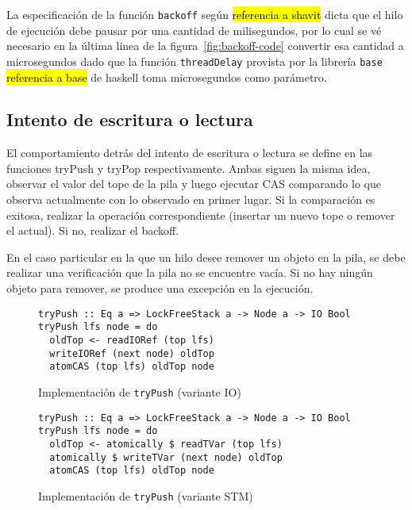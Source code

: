 La especificación de la función \texttt{backoff} según \hl{referencia a shavit} dicta que el hilo de ejecución debe pausar por una cantidad de milisegundos, por lo cual se vé necesario en la última linea de la figura~\ref{fig:backoff-code} convertir esa cantidad a microsegundos dado que la función \texttt{threadDelay} provista por la librería \texttt{base} \hl{referencia a base} de haskell toma microsegundos como parámetro.

\clearpage
\subsection{Intento de escritura o lectura}\label{sub:lfs-tries}
El comportamiento detrás del intento de escritura o lectura se define en las funciones tryPush y tryPop respectivamente. Ambas siguen la misma idea, observar el valor del tope de la pila y luego ejecutar CAS comparando lo que observa actualmente con lo observado en primer lugar. Si la comparación es exitosa, realizar la operación correspondiente (insertar un nuevo tope o remover el actual). Si no, realizar el backoff.

En el caso particular en la que un hilo desee remover un objeto en la pila, se debe realizar una verificación que la pila no se encuentre vacía. Si no hay ningún objeto para remover, se produce una excepción en la ejecución.

\begin{figure}[H]
\begin{verbatim}
tryPush :: Eq a => LockFreeStack a -> Node a -> IO Bool
tryPush lfs node = do
  oldTop <- readIORef (top lfs)
  writeIORef (next node) oldTop
  atomCAS (top lfs) oldTop node
\end{verbatim}
\caption{Implementación de \texttt{tryPush} (variante IO)}
\label{fig:lfs-trypush-io}
\end{figure}

\begin{figure}[H]
\begin{verbatim}
tryPush :: Eq a => LockFreeStack a -> Node a -> IO Bool
tryPush lfs node = do
  oldTop <- atomically $ readTVar (top lfs)
  atomically $ writeTVar (next node) oldTop
  atomCAS (top lfs) oldTop node
\end{verbatim}
\caption{Implementación de \texttt{tryPush} (variante STM)}
\label{fig:lfs-trypush-stm}
\end{figure}

